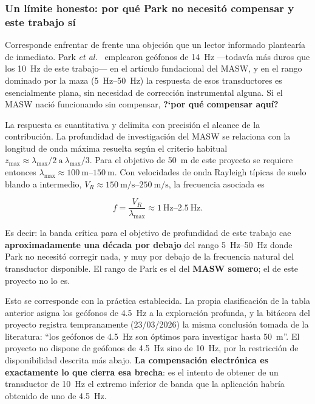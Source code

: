 \subsubsection{Un l\'imite honesto: por qu\'e Park no necesit\'o compensar y este trabajo s\'i}
\label{sec:geo-park}

Corresponde enfrentar de frente una objeci\'on que un lector informado plantear\'ia de
inmediato. Park \emph{et al.}~\cite{Park1999} emplearon ge\'ofonos de \SI{14}{\hertz}
---todav\'ia m\'as duros que los \SI{10}{\hertz} de este trabajo--- en el art\'iculo
fundacional del MASW, y en el rango dominado por la maza
(\SIrange{5}{50}{\hertz}) la respuesta de esos transductores es esencialmente plana, sin
necesidad de correcci\'on instrumental alguna. Si el MASW naci\'o funcionando sin
compensar, \textbf{?`por qu\'e compensar aqu\'i?}

La respuesta es cuantitativa y delimita con precisi\'on el alcance de la contribuci\'on.
La profundidad de investigaci\'on del MASW se relaciona con la longitud de onda m\'axima
resuelta seg\'un el criterio habitual
$z_{\max}\approx\lambda_{\max}/2\ \text{a}\ \lambda_{\max}/3$. Para el objetivo de
\SI{50}{\meter} de este proyecto se requiere entonces
$\lambda_{\max}\approx\SIrange{100}{150}{\meter}$. Con velocidades de onda Rayleigh
t\'ipicas de suelo blando a intermedio, $V_R\approx\SIrange{150}{250}{\meter\per\second}$,
la frecuencia asociada es

\begin{equation}
f=\frac{V_R}{\lambda_{\max}}\approx\SIrange{1}{2.5}{\hertz}.
\label{eq:geo-banda-objetivo}
\end{equation}

Es decir: la banda cr\'itica para el objetivo de profundidad de este trabajo cae
\textbf{aproximadamente una d\'ecada por debajo} del rango \SIrange{5}{50}{\hertz} donde
Park no necesit\'o corregir nada, y muy por debajo de la frecuencia natural del
transductor disponible. El rango de Park es el del \textbf{MASW somero}; el de este
proyecto no lo es.

Esto se corresponde con la pr\'actica establecida. La propia clasificaci\'on de la tabla
anterior asigna los ge\'ofonos de \SI{4.5}{\hertz} a la exploraci\'on profunda, y la
bit\'acora del proyecto registra tempranamente (23/03/2026) la misma conclusi\'on tomada
de la literatura: ``los ge\'ofonos de \SI{4.5}{\hertz} son \'optimos para investigar
hasta \SI{50}{\meter}''. El proyecto no dispone de ge\'ofonos de \SI{4.5}{\hertz} sino de
\SI{10}{\hertz}, por la restricci\'on de disponibilidad descrita m\'as abajo.
\textbf{La compensaci\'on electr\'onica es exactamente lo que cierra esa brecha}: es el
intento de obtener de un transductor de \SI{10}{\hertz} el extremo inferior de banda que
la aplicaci\'on habr\'ia obtenido de uno de \SI{4.5}{\hertz}.

